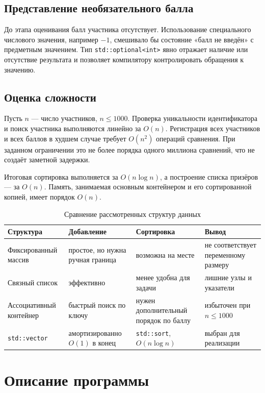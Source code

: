 \documentclass[14pt,a4paper]{extarticle}
\newcommand{\code}[1]{\texttt{#1}}
\begin{document}
\subsection{Представление необязательного балла}

До этапа оценивания балл участника отсутствует. Использование специального числового значения, например $-1$, смешивало бы состояние «балл не введён» с предметным значением. Тип \code{std::optional<int>} явно отражает наличие или отсутствие результата и позволяет компилятору контролировать обращения к значению.

\subsection{Оценка сложности}

Пусть $n$ --- число участников, $n \leq 1000$. Проверка уникальности идентификатора и поиск участника выполняются линейно за $O(n)$. Регистрация всех участников и всех баллов в худшем случае требует $O(n^2)$ операций сравнения. При заданном ограничении это не более порядка одного миллиона сравнений, что не создаёт заметной задержки.

Итоговая сортировка выполняется за $O(n \log n)$, а построение списка призёров --- за $O(n)$. Память, занимаемая основным контейнером и его сортированной копией, имеет порядок $O(n)$.

\begin{table}[H]
\centering
\caption{Сравнение рассмотренных структур данных}
\begin{tabularx}{\textwidth}{|Y|Y|Y|Y|}
\hline
\textbf{Структура} & \textbf{Добавление} & \textbf{Сортировка} & \textbf{Вывод}\\
\hline
Фиксированный массив & простое, но нужна ручная граница & возможна на месте & не соответствует переменному размеру\\
\hline
Связный список & эффективно & менее удобна для задачи & лишние узлы и указатели\\
\hline
Ассоциативный контейнер & быстрый поиск по ключу & нужен дополнительный порядок по баллу & избыточен при $n \leq 1000$\\
\hline
\code{std::vector} & амортизированно $O(1)$ в конец & \code{std::sort}, $O(n\log n)$ & выбран для реализации\\
\hline
\end{tabularx}
\end{table}

\clearpage
\section{Описание программы}
\end{document}
